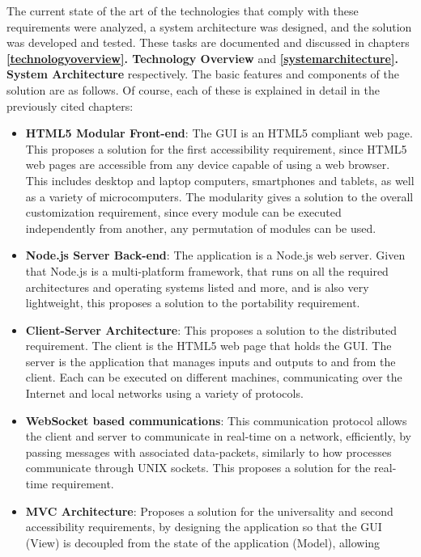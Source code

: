The current state of the art of the technologies that comply with these requirements were analyzed, a system architecture 
was designed, and the solution was developed and tested. These tasks are documented and discussed in chapters 
\textbf{\ref{technologyoverview}. Technology Overview} and \textbf{\ref{systemarchitecture}. System Architecture} 
respectively. The basic features and components of the solution are as follows. Of course, each of these is explained in 
detail in the previously cited chapters:
\begin{itemize}
	\item \textbf{HTML5 Modular Front-end}: The GUI is an HTML5 compliant web page. This proposes a solution for the first 
	accessibility requirement, since HTML5 web pages are accessible from any device capable of using a web browser. This 
	includes desktop and laptop computers, smartphones and tablets, as well as a variety of microcomputers. The modularity 
	gives a solution to the overall customization requirement, since every module can be executed independently from 
	another, any permutation of modules can be used.
	\item \textbf{Node.js Server Back-end}: The application is a Node.js web server. Given that Node.js is a multi-platform 
	framework, that runs on all the required architectures and operating systems listed and more, and is also very 
	lightweight, this proposes a solution to the portability requirement.\\
	\item \textbf{Client-Server Architecture}: This proposes a solution to the distributed requirement. The client is the 
	HTML5 web page that holds the GUI. The server is the application that manages inputs and outputs to and from the client. 
	Each can be executed on different machines, communicating over the Internet and local networks using a variety of 
	protocols.\\
	\item \textbf{WebSocket based communications}: This communication protocol allows the client and server to communicate 
	in real-time on a network, efficiently, by passing messages with associated data-packets, similarly to how processes 
	communicate through UNIX sockets. This proposes a solution for the real-time requirement.\\
	\item \textbf{MVC Architecture}: Proposes a solution for the universality and second accessibility requirements, by 
	designing the application so that the GUI (View) is decoupled from the state of the application (Model), allowing 

\end{itemize}
